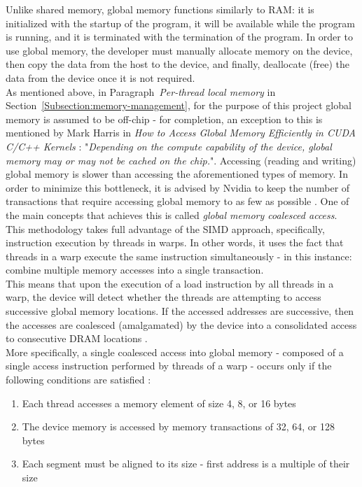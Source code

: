Unlike shared memory, global memory functions similarly to RAM: it is initialized with the startup of the program, it will be available while the program is running, and it is terminated with the termination of the program. In order to use global memory, the developer must manually allocate memory on the device, then copy the data from the host to the device, and finally, deallocate (free) the data from the device \cite{Harris7January2013} once it is not required. \\
As mentioned above, in Paragraph~\emph{Per-thread local memory} in Section~\ref{Subsection:memory-management}, for the purpose of this project global memory is assumed to be off-chip - for completion, an exception to this is mentioned by Mark Harris in \emph{How to Access Global Memory Efficiently in CUDA C/C++ Kernels} \cite{Harris7January2013}: "\textit{Depending on the compute capability of the device, global memory may or may not be cached on the chip.}". Accessing (reading and writing) global memory is slower than accessing the aforementioned types of memory. In order to minimize this bottleneck, it is advised by Nvidia to keep the number of transactions that require accessing global memory to as few as possible \cite{Harris7January2013}. One of the main concepts that achieves this is called \textit{global memory coalesced access}. This methodology takes full advantage of the SIMD approach, specifically, instruction execution by threads in warps. In other words, it uses the fact that threads in a warp execute the same instruction simultaneously - in this instance: combine multiple memory accesses into a single transaction. \\
This means that upon the execution of a load instruction by all threads in a warp, the device will detect whether the threads are attempting to access successive global memory locations. If the accessed addresses are successive, then the accesses are coalesced (amalgamated) by the device into a consolidated access to consecutive DRAM locations \cite{Cabrera4December2019}. \\
More specifically, a single coalesced access into global memory - composed of a single access instruction performed by threads of a warp - occurs only if the following conditions are satisfied \cite{xUOrKLpxlGjvTonr, NVIDIAMay2022}:

\begin{enumerate}\label{Enumerate:theory-CUDA-global-memory-coalesced-access-requirements}
	\item Each thread accesses a memory element of size 4, 8, or 16 bytes
	\item The device memory is accessed by memory transactions of 32, 64, or 128 bytes
	\item Each segment must be aligned to its size - first address is a multiple of their size
\end{enumerate}

